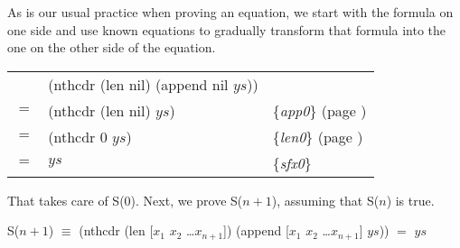 As is our usual practice when proving an equation,
we start with the formula on one side and use known
equations to gradually transform that formula
into the one on the other side of the equation.

\begin{center}
\begin{tabular}{lll}
    & (nthcdr (len nil) (append nil $ys$))  &                                                  \\
$=$ & (nthcdr (len nil) $ys$)               & \{\emph{app0}\} (page \pageref{fig:append-defun})\\
$=$ & (nthcdr 0 $ys$)                       & \{\emph{len0}\} (page \pageref{len-equations})   \\
$=$ & $ys$                                  & \{\emph{sfx0}\}                                  \\
\end{tabular}
\end{center}

That takes care of S(0). Next, we prove S($n+1$), assuming that S($n$) is true.

\begin{samepage}
\begin{center}
S($n+1$) $\equiv$ (nthcdr (len [$x_1$ $x_2$ \dots $x_{n+1}$]) (append [$x_1$ $x_2$ \dots $x_{n+1}$] $ys$)) $=$ $ys$
\end{center}
\end{samepage}

